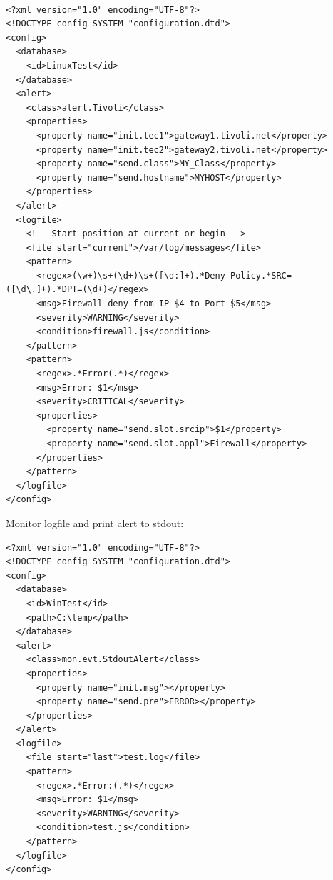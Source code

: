 \documentclass[11pt,a4paper]{article}
\begin{document}
\begin{verbatim}

<?xml version="1.0" encoding="UTF-8"?>
<!DOCTYPE config SYSTEM "configuration.dtd">
<config>
  <database>
    <id>LinuxTest</id>
  </database>
  <alert>
    <class>alert.Tivoli</class>
    <properties>
      <property name="init.tec1">gateway1.tivoli.net</property>
      <property name="init.tec2">gateway2.tivoli.net</property>
      <property name="send.class">MY_Class</property>
      <property name="send.hostname">MYHOST</property>
    </properties>
  </alert>
  <logfile>
    <!-- Start position at current or begin -->
    <file start="current">/var/log/messages</file>
    <pattern>
      <regex>(\w+)\s+(\d+)\s+([\d:]+).*Deny Policy.*SRC=([\d\.]+).*DPT=(\d+)</regex>
      <msg>Firewall deny from IP $4 to Port $5</msg>
      <severity>WARNING</severity>
      <condition>firewall.js</condition>
    </pattern>
    <pattern>
      <regex>.*Error(.*)</regex>
      <msg>Error: $1</msg>
      <severity>CRITICAL</severity>
      <properties>
        <property name="send.slot.srcip">$1</property>
        <property name="send.slot.appl">Firewall</property>
      </properties>
    </pattern>
  </logfile>
</config>

\end{verbatim}

Monitor logfile and print alert to stdout:

\begin{verbatim}
<?xml version="1.0" encoding="UTF-8"?>
<!DOCTYPE config SYSTEM "configuration.dtd">
<config>
  <database>
    <id>WinTest</id>
    <path>C:\temp</path>
  </database>
  <alert>
    <class>mon.evt.StdoutAlert</class>
    <properties>
      <property name="init.msg"></property>
      <property name="send.pre">ERROR></property>
    </properties>
  </alert>
  <logfile>
    <file start="last">test.log</file>
    <pattern>
      <regex>.*Error:(.*)</regex>
      <msg>Error: $1</msg>
      <severity>WARNING</severity>
      <condition>test.js</condition>
    </pattern>
  </logfile>
</config>
\end{verbatim}
\end{document}
